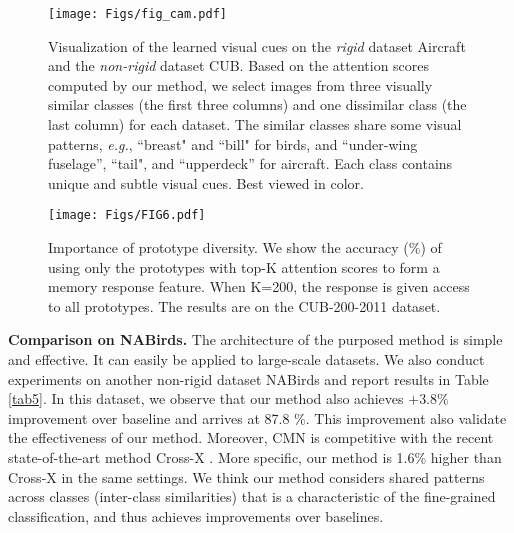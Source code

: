 \documentclass[journal]{IEEEtran}
\begin{document}
\begin{figure*}[t]
\begin{center}
\texttt{[image: Figs/fig\_cam.pdf]}
\end{center}
\caption{Visualization of the learned visual cues on the \emph{rigid} dataset Aircraft and the \emph{non-rigid} dataset CUB. Based on the attention scores computed by our method, we select images from three visually similar classes (the first three columns) and one dissimilar class (the last column) for each dataset. The similar classes share some visual patterns, \emph{e.g.}, ``breast" and ``bill" for birds, and ``under-wing fuselage'', ``tail", and ``upperdeck'' for aircraft.  Each class contains unique and subtle visual cues. Best viewed in color.}
\label{fig_cam}
\end{figure*}
\begin{figure}[t]
    \centering
   {\texttt{[image: Figs/FIG6.pdf]}}\caption{Importance of prototype diversity. We show the accuracy (\%) of using only the prototypes with top-K attention scores to form a memory response feature. When K=200, the response is given access to all prototypes. The results are on the CUB-200-2011 dataset.}
    \label{fig_ab}\end{figure}


\textbf{Comparison on NABirds.} The architecture of the purposed method is simple and effective. It can easily be applied to large-scale datasets. We also conduct experiments on another non-rigid dataset NABirds and report results in Table \ref{tab5}. In this dataset, we observe that our method also achieves $+3.8\%$ improvement over baseline and arrives at 87.8 \%. This improvement also validate the effectiveness of our method. Moreover, CMN is competitive with the recent state-of-the-art method Cross-X \cite{luo2019cross}. More specific, our method is 1.6\% higher than Cross-X in the same settings.
We think our method considers shared patterns across classes (inter-class similarities) that is a characteristic of the fine-grained classification, and thus achieves improvements over baselines. 
\end{document}
